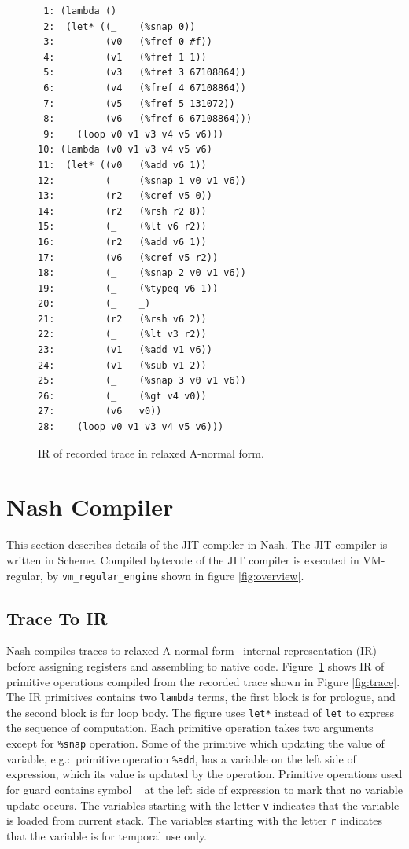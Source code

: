 \documentclass[preprint]{sigplanconf}
\begin{document}
\begin{figure}
\begin{verbatim}
 1: (lambda ()
 2:  (let* ((_    (%snap 0))
 3:         (v0   (%fref 0 #f))
 4:         (v1   (%fref 1 1))
 5:         (v3   (%fref 3 67108864))
 6:         (v4   (%fref 4 67108864))
 7:         (v5   (%fref 5 131072))
 8:         (v6   (%fref 6 67108864)))
 9:    (loop v0 v1 v3 v4 v5 v6)))
10: (lambda (v0 v1 v3 v4 v5 v6)
11:  (let* ((v0   (%add v6 1))
12:         (_    (%snap 1 v0 v1 v6))
13:         (r2   (%cref v5 0))
14:         (r2   (%rsh r2 8))
15:         (_    (%lt v6 r2))
16:         (r2   (%add v6 1))
17:         (v6   (%cref v5 r2))
18:         (_    (%snap 2 v0 v1 v6))
19:         (_    (%typeq v6 1))
20:         (_    _)
21:         (r2   (%rsh v6 2))
22:         (_    (%lt v3 r2))
23:         (v1   (%add v1 v6))
24:         (v1   (%sub v1 2))
25:         (_    (%snap 3 v0 v1 v6))
26:         (_    (%gt v4 v0))
27:         (v6   v0))
28:    (loop v0 v1 v3 v4 v5 v6)))
\end{verbatim}
\caption{IR of recorded trace in relaxed A-normal form.}
\label{fig:anf}
\end{figure}

\section{Nash Compiler}
\label{sec:compiler}

This section describes details of the JIT compiler in Nash. The JIT compiler is
written in Scheme. Compiled bytecode of the JIT compiler is executed in
VM-regular, by \texttt{vm\_regular\_engine} shown in figure
\hyperref[fig:overview]{\ref{fig:overview}}.

\subsection{Trace To IR}
Nash compiles traces to relaxed A-normal form~\cite{flanagan1993essence}
internal representation (IR) before assigning registers and assembling to native
code. Figure~\hyperref[fig:anf]{\ref{fig:anf}} shows IR of primitive operations
compiled from the recorded trace shown in Figure
\hyperref[fig:trace]{\ref{fig:trace}}. The IR primitives contains two
\texttt{lambda} terms, the first block is for prologue, and the second block is
for loop body. The figure uses \texttt{let*} instead of \texttt{let} to express
the sequence of computation. Each primitive operation takes two arguments except
for \texttt{\%snap} operation. Some of the primitive which updating the value of
variable, e.g.:\ primitive operation \texttt{\%add}, has a variable on the left
side of expression, which its value is updated by the operation. Primitive
operations used for guard contains symbol \texttt{\_} at the left side of
expression to mark that no variable update occurs. The variables starting with
the letter \texttt{v} indicates that the variable is loaded from current
stack. The variables starting with the letter \texttt{r} indicates that the
variable is for temporal use only.
\end{document}
